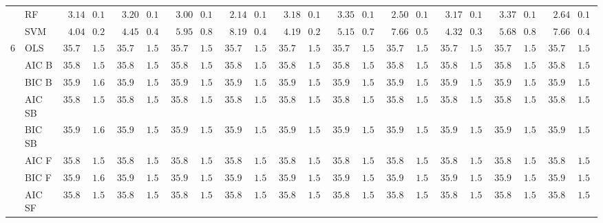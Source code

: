 \begin{tabular}{p{0.2cm}p{1cm}|p{0.6cm}p{0.6cm}|p{0.6cm}p{0.6cm}p{0.6cm}p{0.6cm}p{0.6cm}p{0.6cm}|p{0.6cm}p{0.6cm}p{0.6cm}p{0.6cm}p{0.6cm}p{0.6cm}|p{0.6cm}p{0.6cm}p{0.6cm}p{0.6cm}p{0.6cm}p{0.6cm}}
 & RF  & $\phantom{0}3.14$ & $0.12$ & $\phantom{0}3.20$ & $0.12$ & $\phantom{0}3.00$ & $0.12$ & $\phantom{0}2.14$ & $0.10$ & $\phantom{0}3.18$ & $0.13$ & $\phantom{0}3.35$ & $0.13$ & $\phantom{0}2.50$ & $0.11$ & $\phantom{0}3.17$ & $0.14$ & $\phantom{0}3.37$ & $0.14$ & $\phantom{0}2.64$ & $0.12$ \\
 & SVM  & $\phantom{0}4.04$ & $0.26$ & $\phantom{0}4.45$ & $0.42$ & $\phantom{0}5.95$ & $0.80$ & $\phantom{0}8.19$ & $0.43$ & $\phantom{0}4.19$ & $0.27$ & $\phantom{0}5.15$ & $0.78$ & $\phantom{0}7.66$ & $0.54$ & $\phantom{0}4.32$ & $0.35$ & $\phantom{0}5.68$ & $0.87$ & $\phantom{0}7.66$ & $0.46$ \\\hline
6 & OLS  & $35.73$ & $1.56$ & $35.73$ & $1.56$ & $35.73$ & $1.56$ & $35.73$ & $1.56$ & $35.73$ & $1.56$ & $35.73$ & $1.56$ & $35.73$ & $1.56$ & $35.73$ & $1.56$ & $35.73$ & $1.56$ & $35.73$ & $1.56$ \\
 & AIC B  & $35.83$ & $1.56$ & $35.83$ & $1.56$ & $35.82$ & $1.56$ & $35.82$ & $1.56$ & $35.82$ & $1.56$ & $35.82$ & $1.56$ & $35.82$ & $1.56$ & $35.83$ & $1.57$ & $35.82$ & $1.56$ & $35.83$ & $1.57$ \\
 & BIC B  & $35.95$ & $1.60$ & $35.93$ & $1.58$ & $35.94$ & $1.56$ & $35.95$ & $1.58$ & $35.94$ & $1.57$ & $35.93$ & $1.56$ & $35.93$ & $1.57$ & $35.95$ & $1.57$ & $35.95$ & $1.57$ & $35.94$ & $1.57$ \\
 & AIC SB  & $35.83$ & $1.56$ & $35.83$ & $1.56$ & $35.82$ & $1.56$ & $35.82$ & $1.56$ & $35.82$ & $1.56$ & $35.82$ & $1.56$ & $35.82$ & $1.56$ & $35.83$ & $1.57$ & $35.82$ & $1.56$ & $35.83$ & $1.57$ \\
 & BIC SB  & $35.95$ & $1.60$ & $35.93$ & $1.58$ & $35.94$ & $1.56$ & $35.95$ & $1.58$ & $35.94$ & $1.57$ & $35.93$ & $1.56$ & $35.93$ & $1.57$ & $35.95$ & $1.57$ & $35.95$ & $1.57$ & $35.94$ & $1.57$ \\
 & AIC F  & $35.83$ & $1.56$ & $35.83$ & $1.56$ & $35.83$ & $1.56$ & $35.82$ & $1.56$ & $35.83$ & $1.56$ & $35.84$ & $1.56$ & $35.85$ & $1.56$ & $35.83$ & $1.57$ & $35.83$ & $1.57$ & $35.84$ & $1.56$ \\
 & BIC F  & $35.95$ & $1.60$ & $35.93$ & $1.58$ & $35.95$ & $1.56$ & $35.95$ & $1.58$ & $35.94$ & $1.57$ & $35.93$ & $1.56$ & $35.94$ & $1.58$ & $35.95$ & $1.57$ & $35.95$ & $1.57$ & $35.94$ & $1.57$ \\
 & AIC SF  & $35.83$ & $1.56$ & $35.83$ & $1.56$ & $35.83$ & $1.56$ & $35.82$ & $1.56$ & $35.83$ & $1.56$ & $35.84$ & $1.56$ & $35.85$ & $1.56$ & $35.83$ & $1.57$ & $35.83$ & $1.57$ & $35.84$ & $1.56$ \\

\end{tabular}
